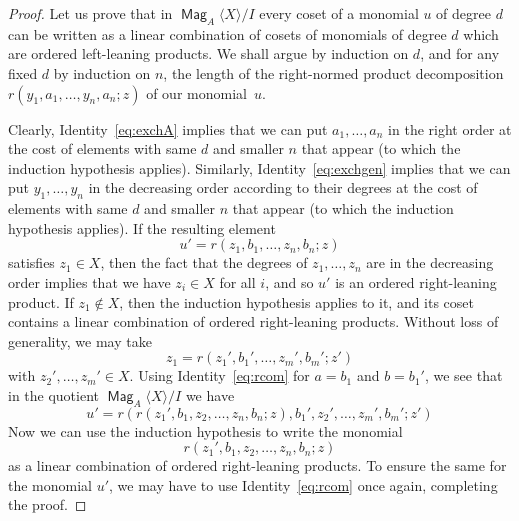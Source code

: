 \documentclass[10pt,a4paper]{article}
\theoremstyle{definition}
\numberwithin{equation}{section}
\numberwithin{figure}{section}
\DeclareMathOperator{\Mag}{\mathsf{Mag}}
\begin{document}
\begin{proof}
Let us prove that in $\Mag_A\langle X\rangle/I$ every coset of a monomial $u$ of degree $d$ can be written as a linear combination of cosets of monomials of degree $d$ which are ordered left-leaning products. We shall argue by induction on $d$, and for any fixed $d$ by induction on $n$, the length of the right-normed product decomposition $r(y_1,a_1,\dots,y_n,a_n;z)$ of our monomial~$u$.

Clearly, Identity~\eqref{eq:exchA} implies that we can put $a_1,\dots,a_n$ in the right order at the cost of elements with same $d$ and smaller $n$ that appear (to which the induction hypothesis applies). Similarly, Identity~\eqref{eq:exchgen} implies that we can put $y_1,\dots,y_{n}$ in the decreasing order according to their degrees at the cost of elements with same $d$ and smaller $n$ that appear (to which the induction hypothesis applies). If the resulting element
\[
u'=r\left(z_1,b_1,\dots,z_n,b_n;z\right)
\]
satisfies $z_1\in X$, then the fact that the degrees of $z_1,\dots,z_{n}$ are in the decreasing order implies that we have $z_i\in X$ for all $i$, and so $u'$ is an ordered right-leaning product. If $z_1\notin X$, then the induction hypothesis applies to it, and its coset contains a linear combination of ordered right-leaning products. Without loss of generality, we may take
\[
z_1=r\left(z_1',b_1',\dots,z_m',b_m';z'\right)
\]
with $z_2',\dots,z_m'\in X$. Using Identity~\eqref{eq:rcom} for $a=b_1$ and $b=b_1'$, we see that in the quotient $\Mag_A\langle X\rangle/I$ we have
\[
u'=r\left(r\left(z_1',b_1,z_2,\dots,z_n,b_n;z\right),b_1',z_2',\dots,z_m',b_m';z'\right)
\]
Now we can use the induction hypothesis to write the monomial
\[
r(z_1',b_1,z_2,\dots,z_n,b_n;z)
\]
as a linear combination of ordered right-leaning products. To ensure the same for the monomial $u'$, we may have to use Identity~\eqref{eq:rcom} once again, completing the proof.
\end{proof}
\end{document}
